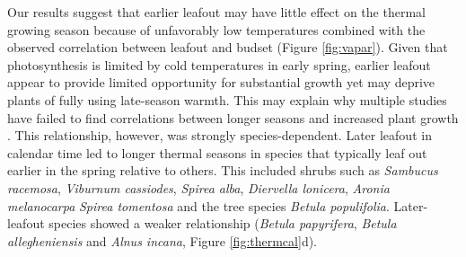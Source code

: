 \documentclass{article}[12pt]
\begin{document}
Our results suggest that earlier leafout may have little effect on the thermal growing season because of unfavorably low temperatures combined with the observed correlation between leafout and budset (Figure \ref{fig:vapar}). Given that photosynthesis is limited by cold temperatures in early spring, earlier leafout appear to provide limited opportunity for substantial growth yet may deprive plants of fully using late-season warmth. This may explain why multiple studies have failed to find correlations between longer seasons and increased plant growth \citep{cufar2015variations,camarero2022decoupled,dow2022warm,silvestro2023longer}. %
This relationship, however, was strongly species-dependent. Later leafout in calendar time led to longer thermal seasons in species that typically leaf out earlier in the spring relative to others. This included shrubs such as \emph{Sambucus racemosa}, \emph{Viburnum cassiodes}, \emph{Spirea alba}, \emph{Diervella lonicera}, \emph{Aronia melanocarpa} \emph{Spirea tomentosa} and the tree species \emph{Betula populifolia}. Later-leafout species showed a weaker relationship (\emph{Betula papyrifera}, \emph{Betula allegheniensis} and \emph{Alnus incana}, Figure \ref{fig:thermcal}d). 
\end{document}
